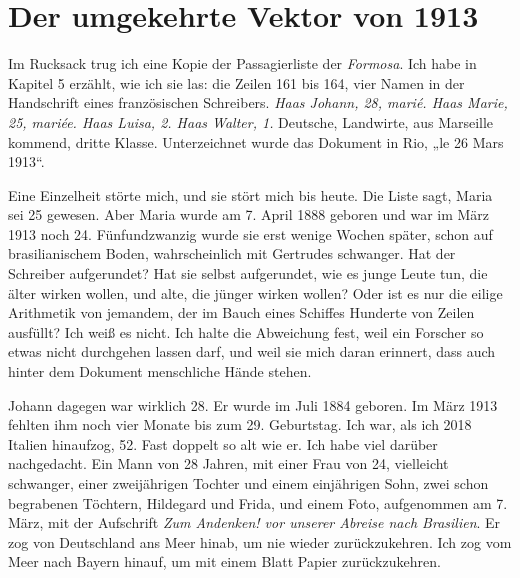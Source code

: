 \documentclass[
  ngerman,
  11pt,
  openany]{book}
\begin{document}
\section{Der umgekehrte Vektor von
1913}\label{der-umgekehrte-vektor-von-1913}

Im Rucksack trug ich eine Kopie der Passagierliste der \emph{Formosa}.
Ich habe in Kapitel 5 erzählt, wie ich sie las: die Zeilen 161 bis 164,
vier Namen in der Handschrift eines französischen Schreibers. \emph{Haas
Johann, 28, marié. Haas Marie, 25, mariée. Haas Luisa, 2. Haas Walter,
1.} Deutsche, Landwirte, aus Marseille kommend, dritte Klasse.
Unterzeichnet wurde das Dokument in Rio, „le 26 Mars 1913``.

Eine Einzelheit störte mich, und sie stört mich bis heute. Die Liste
sagt, Maria sei 25 gewesen. Aber Maria wurde am 7. April 1888 geboren
und war im März 1913 noch 24. Fünfundzwanzig wurde sie erst wenige
Wochen später, schon auf brasilianischem Boden, wahrscheinlich mit
Gertrudes schwanger. Hat der Schreiber aufgerundet? Hat sie selbst
aufgerundet, wie es junge Leute tun, die älter wirken wollen, und alte,
die jünger wirken wollen? Oder ist es nur die eilige Arithmetik von
jemandem, der im Bauch eines Schiffes Hunderte von Zeilen ausfüllt? Ich
weiß es nicht. Ich halte die Abweichung fest, weil ein Forscher so etwas
nicht durchgehen lassen darf, und weil sie mich daran erinnert, dass
auch hinter dem Dokument menschliche Hände stehen.

Johann dagegen war wirklich 28. Er wurde im Juli 1884 geboren. Im März
1913 fehlten ihm noch vier Monate bis zum 29. Geburtstag. Ich war, als
ich 2018 Italien hinaufzog, 52. Fast doppelt so alt wie er. Ich habe
viel darüber nachgedacht. Ein Mann von 28 Jahren, mit einer Frau von 24,
vielleicht schwanger, einer zweijährigen Tochter und einem einjährigen
Sohn, zwei schon begrabenen Töchtern, Hildegard und Frida, und einem
Foto, aufgenommen am 7. März, mit der Aufschrift \emph{Zum Andenken! vor
unserer Abreise nach Brasilien}. Er zog von Deutschland ans Meer hinab,
um nie wieder zurückzukehren. Ich zog vom Meer nach Bayern hinauf, um
mit einem Blatt Papier zurückzukehren.
\end{document}
